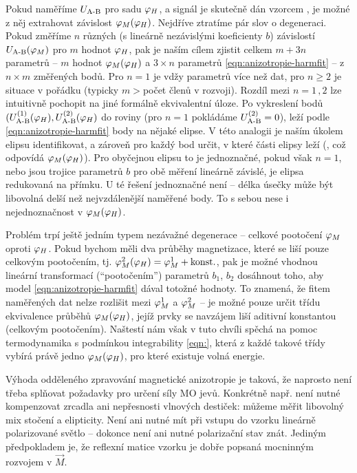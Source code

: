 Pokud naměříme $U_\textrm{A-B}$ pro sadu $\varphi_H$, a signál je skutečně dán vzorcem \label{eqn:anizotropie-harmfit}, je možné z něj extrahovat závislost $\varphi_M(\varphi_H)$.
Nejdříve ztratíme pár slov o degeneraci.
Pokud změříme $n$ různých (s lineárně nezávislými koeficienty $b$) závislostí $U_\textrm{A-B}(\varphi_M)$ pro $m$ hodnot $\varphi_H$, pak je naším cílem zjistit celkem $m+3n$ parametrů -- $m$ hodnot $\varphi_M(\varphi_H)$ a $3\times n$ parametrů \eqref{eqn:anizotropie-harmfit} -- z $n\times m$ změřených bodů.
Pro $n=1$ je vdžy parametrů více než dat, pro $n\geq 2$ je situace v pořádku (typicky $m>$počet členů v rozvoji).
Rozdíl mezi $n=1\,,2$ lze intuitivně pochopit na jiné formálně ekvivalentní úloze.
Po vykreslení bodů $(U_\textrm{A-B}^{(1)}(\varphi_H), U_\textrm{A-B}^{(2)}(\varphi_H)$ do roviny (pro $n=1$ pokládáme $U_\textrm{A-B}^{(2)}=0$), leží podle \eqref{eqn:anizotropie-harmfit} body na nějaké elipse.
V této analogii je naším úkolem elipsu identifikovat, a zároveň pro každý bod určit, v které části elipsy leží (, což odpovídá $\varphi_M(\varphi_H)$).
Pro obyčejnou elipsu to je jednoznačné, pokud však $n=1$, nebo jsou trojice parametrů $b$ pro obě měření lineárně závislé, je elipsa redukovaná na přímku.
U té řešení jednoznačné není -- délka úsečky může být libovolná delší než nejvzdálenější naměřené body.
To s sebou nese i nejednoznačnost v $\varphi_M(\varphi_H)$.

Problém trpí ještě jedním typem nezávažné degenerace -- celkové pootočení $\varphi_M$ oproti $\varphi_H$.
Pokud bychom měli dva průběhy magnetizace, které se liší pouze celkovým pootočením, tj. $\varphi_M^2(\varphi_H)=\varphi_M^1 + \textrm{konst.}$,
pak je možné vhodnou lineární transformací (``pootočením'') parametrů $b_1$, $b_2$ dosáhnout toho, aby model \eqref{eqn:anizotropie-harmfit} dával totožné hodnoty.
To znamená, že fitem naměřených dat nelze rozlišit mezi $\varphi_M^1$ a $\varphi_M^2$ -- je možné pouze určit třídu ekvivalence průběhů $\varphi_M(\varphi_H)$, jejíž prvky se navzájem liší aditivní konstantou (celkovým pootočením).
Naštestí nám však v tuto chvíli spěchá na pomoc termodynamika s podmínkou integrability \eqref{eqn:}, která z každé takové třídy vybírá právě jedno $\varphi_M(\varphi_H)$, pro které existuje volná energie.

Výhoda odděleného zpravování magnetické anizotropie je taková, že naprosto není třeba splňovat požadavky pro určení síly MO jevů.
Konkrétně např. není nutné kompenzovat zrcadla ani nepřesnosti vlnových destiček: můžeme měřit libovolný mix stočení a elipticity.
Není ani nutné mít při vstupu do vzorku lineárně polarizované světlo -- dokonce není ani nutné polarizační stav znát.
Jediným předpokladem je, že reflexní matice vzorku je dobře popsaná mocninným rozvojem v $\vec{M}$.

